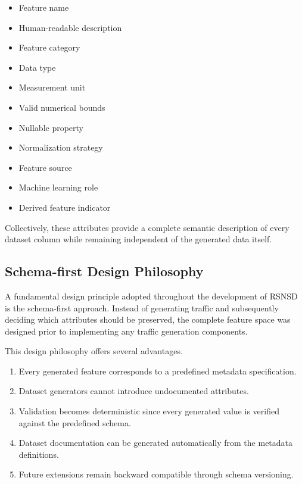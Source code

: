\documentclass[12pt,a4paper]{article}
\begin{document}
\begin{itemize}
	
	\item Feature name
	
	\item Human-readable description
	
	\item Feature category
	
	\item Data type
	
	\item Measurement unit
	
	\item Valid numerical bounds
	
	\item Nullable property
	
	\item Normalization strategy
	
	\item Feature source
	
	\item Machine learning role
	
	\item Derived feature indicator
	
\end{itemize}

Collectively, these attributes provide a complete semantic description of every dataset column while remaining independent of the generated data itself.

\subsection{Schema-first Design Philosophy}

A fundamental design principle adopted throughout the development of RSNSD is the schema-first approach. Instead of generating traffic and subsequently deciding which attributes should be preserved, the complete feature space was designed prior to implementing any traffic generation components.

This design philosophy offers several advantages.

\begin{enumerate}
	
	\item Every generated feature corresponds to a predefined metadata specification.
	
	\item Dataset generators cannot introduce undocumented attributes.
	
	\item Validation becomes deterministic since every generated value is verified against the predefined schema.
	
	\item Dataset documentation can be generated automatically from the metadata definitions.
	
	\item Future extensions remain backward compatible through schema versioning.
	
\end{enumerate}
\end{document}
